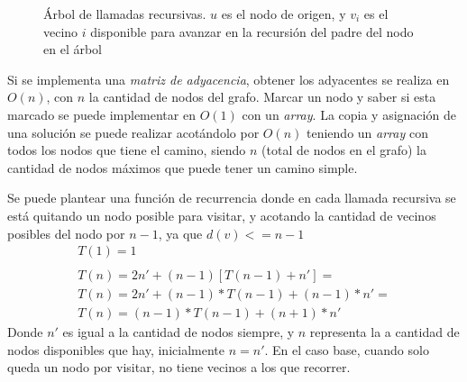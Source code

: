 \begin{figure}[htbp]
\centering
{}

\caption{\'Arbol de llamadas recursivas. $u$ es el nodo de origen, y $v_i$ es el vecino $i$ disponible para avanzar en la recursi\'on del padre del nodo en el \'arbol}
\label{exacto:arbol_llamadas}
\end{figure}

Si se implementa una \emph{matriz de adyacencia}, obtener los adyacentes se realiza en $O(n)$, con $n$ la cantidad de nodos del grafo.
Marcar un nodo y saber si esta marcado se puede implementar en $O(1)$ con un \emph{array}.
La copia y asignaci\'on de una soluci\'on se puede realizar acot\'andolo por $O(n)$ teniendo un \emph{array} con todos los nodos que tiene el camino, siendo $n$ (total de nodos en el grafo) la cantidad de nodos m\'aximos que puede tener un camino simple.

Se puede plantear una funci\'on de recurrencia donde en cada llamada recursiva se est\'a quitando un nodo posible para visitar, y acotando la cantidad de vecinos posibles del nodo por $n - 1$, ya que $d(v) <= n -1$
\begin{equation*}
\begin{split}
T(1) = 1 \\
\\
T(n) = 2n' + (n-1)[T(n-1) + n'] = \\
T(n) = 2n' + (n-1)*T(n-1) + (n-1)*n' = \\
T(n) = (n-1)*T(n-1) + (n+1)*n'
\end{split}
\end{equation*}
Donde $n'$ es igual a la cantidad de nodos siempre, y $n$ representa la a cantidad de nodos disponibles que hay, inicialmente $n = n'$. En el caso base, cuando solo queda un nodo por visitar, no tiene vecinos a los que recorrer.

